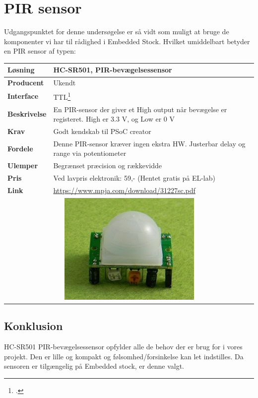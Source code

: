 \section{PIR sensor}

Udgangspunktet for denne undersøgelse er så vidt som muligt at bruge de komponenter vi har til rådighed i Embedded Stock. Hvilket umiddelbart betyder en PIR sensor af typen:

\begin{table}[H] \centering
\begin{tabular}{|p{3cm}|p{11cm}|}
	\hline
	\textbf{Løsning}		
	    & HC-SR501, PIR-bevægelsessensor
	\\ \hline
	\textbf{Producent} 		
	    & Ukendt
	\\ \hline
	\textbf{Interface} 		
	    & TTL\footcite{ttl}
	\\ \hline
	\textbf{Beskrivelse} 	
	    & En PIR-sensor der giver et High output når bevægelse er registeret. High er 3.3 V, og Low er 0 V
	\\ \hline
	\textbf{Krav} 			
	    & Godt kendskab til PSoC creator
	\\ \hline
	\textbf{Fordele}		
	    & Denne PIR-sensor kræver ingen ekstra HW. Justerbar delay og range via potentiometer
	\\ \hline
	\textbf{Ulemper} 		
	    & Begrænset præcision og rækkevidde
	\\ \hline
	\textbf{Pris} 			
	    & Ved lavpris elektronik: 59,- (Hentet gratis på EL-lab)
	\\ \hline
	\textbf{Link} 			
	    & \url{https://www.mpja.com/download/31227sc.pdf} 
	\\ \hline
	\multicolumn{2}{|c|}{\includegraphics[width=0.3\linewidth]{0_Filer/Figuer/Forudundersoegelse/PIR_sensor_billede.jpg}}
    \\ \hline
\end{tabular}
\end{table}

\subsection{Konklusion}

HC-SR501 PIR-bevægelsessensor opfylder alle de behov der er brug for i vores projekt. Den er lille og kompakt og følsomhed/forsinkelse kan let indstilles. Da sensoren er tilgængelig på Embedded stock, er denne valgt.
